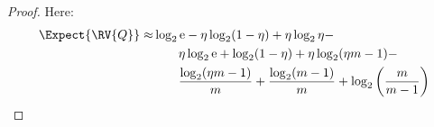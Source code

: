 \documentclass[ ../main.tex]{subfiles}
\begin{document}
\begin{proof}
	Here:
	\begin{equation}
	\begin{split}
	\Expect{\RV{Q}} \approx & \log_2 \mathrm{e} - \eta  \log_2 (1-\eta) + \eta \log_2 \eta - \\
	&\qquad \eta \log_2 \mathrm{e} + \log_2(1-\eta ) + \eta \log_2(\eta  m-1) -\\ &\qquad \frac{\log_2(\eta  m-1)}{m}+\frac{\log_2(m-1)}{m} + \log_2\left(\frac{m}{m-1}\right)
	\end{split}
	\end{equation}
\end{proof}
\end{document}
